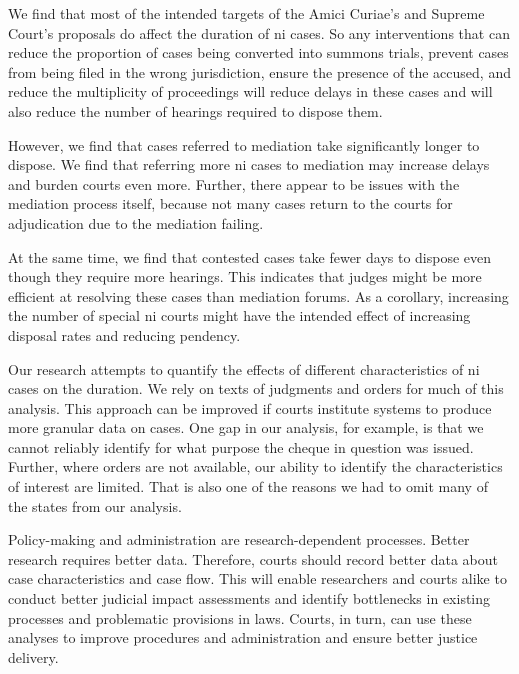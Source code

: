 We find that most of the intended targets of the Amici Curiae's and Supreme Court's proposals do affect the duration of \gls{ni} cases. So any interventions that can reduce the proportion of cases being converted into summons trials, prevent cases from being filed in the wrong jurisdiction, ensure the presence of the accused, and reduce the multiplicity of proceedings will reduce delays in these cases and will also reduce the number of hearings required to dispose them.

However, we find that cases referred to mediation take significantly longer to dispose. We find that referring more \gls{ni} cases to mediation may increase delays and burden courts even more. Further, there appear to be issues with the mediation process itself, because not many cases return to the courts for adjudication due to the mediation failing.

At the same time, we find that contested cases take fewer days to dispose even though they require more hearings. This indicates that judges might be more efficient at resolving these cases than mediation forums. As a corollary, increasing the number of special \gls{ni} courts might have the intended effect of increasing disposal rates and reducing pendency.

Our research attempts to quantify the effects of different characteristics of \gls{ni} cases on the duration. We rely on texts of judgments and orders for much of this analysis. This approach can be improved if courts institute systems to produce more granular data on cases. One gap in our analysis, for example, is that we cannot reliably identify for what purpose the cheque in question was issued. Further, where orders are not available, our ability to identify the characteristics of interest are limited. That is also one of the reasons we had to omit many of the states from our analysis.

Policy-making and administration are research-dependent processes. Better research requires better data. Therefore, courts should record better data about case characteristics and case flow. This will enable researchers and courts alike to conduct better judicial impact assessments and identify bottlenecks in existing processes and problematic provisions in laws. Courts, in turn, can use these analyses to improve procedures and administration and ensure better justice delivery.

